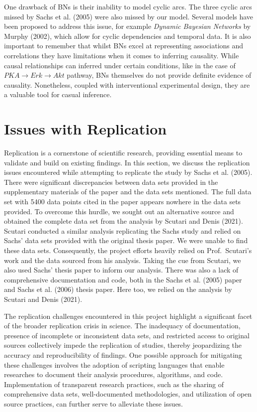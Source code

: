 \documentclass[twocol]{ametsoc}
\begin{document}
One drawback of BNs is their inability to model cyclic arcs. The three
cyclic arcs missed by Sachs et al. (2005) were also missed by our model.
Several models have been proposed to address this issue, for example
\emph{Dynamic Bayesian Networks} by Murphy (2002), which allow for
cyclic dependencies and temporal data. It is also important to remember
that whilst BNs excel at representing associations and correlations they
have limitations when it comes to inferring causality. While causal
relationships can inferred under certain conditions, like in the case of
\(PKA \to Erk \to Akt\) pathway, BNs themselves do not provide definite
evidence of causality. Nonetheless, coupled with interventional
experimental design, they are a valuable tool for casual inference.

\hypertarget{issues-with-replication}{%
\section{Issues with Replication}\label{issues-with-replication}}

Replication is a cornerstone of scientific research, providing essential
means to validate and build on existing findings. In this section, we
discuss the replication issues encountered while attempting to replicate
the study by Sachs et al. (2005). There were significant discrepancies
between data sets provided in the supplementary materials of the paper
and the data sets mentioned. The full data set with 5400 data points
cited in the paper appears nowhere in the data sets provided. To
overcome this hurdle, we sought out an alternative source and obtained
the complete data set from the analysis by Scutari and Denis (2021).
Scutari conducted a similar analysis replicating the Sachs study and
relied on Sachs' data sets provided with the original thesis paper. We
were unable to find these data sets. Consequently, the project efforts
heavily relied on Prof.~Scutari's work and the data sourced from his
analysis. Taking the cue from Scutari, we also used Sachs' thesis paper
to inform our analysis. There was also a lack of comprehensive
documentation and code, both in the Sachs et al. (2005) paper and Sachs
et al. (2006) thesis paper. Here too, we relied on the analysis by
Scutari and Denis (2021).

The replication challenges encountered in this project highlight a
significant facet of the broader replication crisis in science. The
inadequacy of documentation, presence of incomplete or inconsistent data
sets, and restricted access to original sources collectively impede the
replication of studies, thereby jeopardizing the accuracy and
reproducibility of findings. One possible approach for mitigating these
challenges involves the adoption of scripting languages that enable
researches to document their analysis procedures, algorithms, and code.
Implementation of transparent research practices, such as the sharing of
comprehensive data sets, well-documented methodologies, and utilization
of open source practices, can further serve to alleviate these issues.
\end{document}
